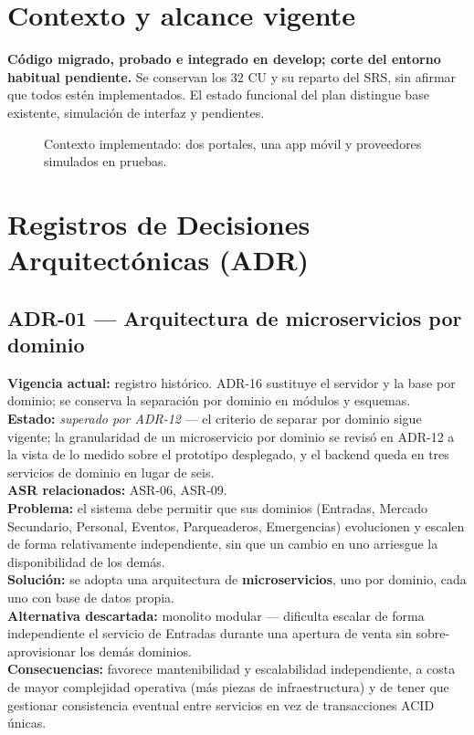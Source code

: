 \documentclass[11pt,a4paper]{article}
\begin{document}
\section{Contexto y alcance vigente}
\label{sec:contexto}
\textbf{Código migrado, probado e integrado en develop; corte del entorno habitual pendiente.}
Se conservan los 32 CU y su reparto del SRS, sin afirmar que todos estén implementados.
El estado funcional del plan distingue base existente, simulación de interfaz y pendientes.
\begin{figure}[H]\centering\HexContexto
\caption{Contexto implementado: dos portales, una app móvil y proveedores simulados en pruebas.}
\label{fig:contexto}\end{figure}


\section{Registros de Decisiones Arquitectónicas (ADR)}
\label{sec:adr}

\subsection*{ADR-01 --- Arquitectura de microservicios por dominio}
\textbf{Vigencia actual:} registro histórico. ADR-16 sustituye el servidor y la base por dominio; se conserva la separación por dominio en módulos y esquemas.\\
\textbf{Estado:} \textit{superado por ADR-12} --- el criterio de separar por dominio sigue vigente;
la granularidad de un microservicio por dominio se revisó en ADR-12 a la vista de lo medido sobre el
prototipo desplegado, y el backend queda en tres servicios de dominio en lugar de seis.\\
\textbf{ASR relacionados:} ASR-06, ASR-09.\\
\textbf{Problema:} el sistema debe permitir que sus dominios (Entradas, Mercado Secundario,
Personal, Eventos, Parqueaderos, Emergencias) evolucionen y escalen de forma relativamente
independiente, sin que un cambio en uno arriesgue la disponibilidad de los demás.\\
\textbf{Solución:} se adopta una arquitectura de \textbf{microservicios}, uno por dominio, cada
uno con base de datos propia.\\
\textbf{Alternativa descartada:} monolito modular — dificulta escalar de forma independiente el
servicio de Entradas durante una apertura de venta sin sobre-aprovisionar los demás dominios.\\
\textbf{Consecuencias:} favorece mantenibilidad y escalabilidad independiente, a costa de mayor
complejidad operativa (más piezas de infraestructura) y de tener que gestionar consistencia
eventual entre servicios en vez de transacciones ACID únicas.
\end{document}
